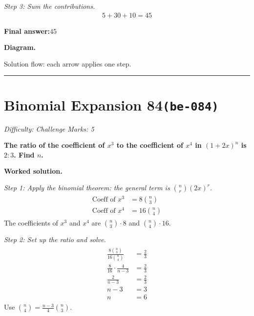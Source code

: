\documentclass[11pt]{article}
\newcommand{\question}[1]{\par\medskip\noindent\textbf{#1}\par}
\begin{document}
\textit{Step 3: Sum the contributions.}
\[\begin{gathered}
5 + 30 + 10 = 45
\end{gathered}\]
\begin{answerbox}
\textbf{Final answer:}\quad \(\displaystyle 45\)
\end{answerbox}
\textbf{Diagram.}

\begin{center}
\end{center}
\small Solution flow: each arrow applies one step.\normalsize

\medskip\hrule

\section*{Binomial Expansion 84\quad\small\texttt{(be-084)}}
\textit{Difficulty: Challenge \quad\textbar\quad Marks: 5}

\question{The ratio of the coefficient of \( x^3 \) to the coefficient of \( x^4 \) in \( (1 + 2x)^n \) is \( 2:3 \). Find \( n \).}

\textbf{Worked solution.}

\textit{Step 1: Apply the binomial theorem: the general term is \(\binom{n}{r}(2x)^r\).}
\[\begin{gathered}
\begin{aligned} \text{Coeff of } x^3 &= 8\binom{n}{3} \\ \text{Coeff of } x^4 &= 16\binom{n}{4} \end{aligned}
\end{gathered}\]
The coefficients of \(x^3\) and \(x^4\) are \(\binom{n}{3} \cdot 8\) and \(\binom{n}{4} \cdot 16\).

\textit{Step 2: Set up the ratio and solve.}
\[\begin{gathered}
\begin{aligned} \frac{8\binom{n}{3}}{16\binom{n}{4}} &= \frac{2}{3} \\ \frac{8}{16} \cdot \frac{4}{n-3} &= \frac{2}{3} \\ \frac{2}{n-3} &= \frac{2}{3} \\ n - 3 &= 3 \\ n &= 6 \end{aligned}
\end{gathered}\]
Use \(\binom{n}{4} = \frac{n-3}{4} \binom{n}{3}\).
\end{document}
